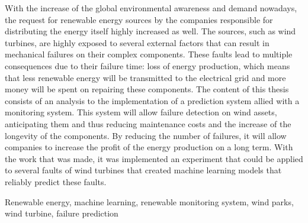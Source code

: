 



With the increase of the global environmental awareness and demand nowadays, the request for renewable energy sources by the companies responsible for distributing the energy itself highly increased as well. The sources, such as wind turbines, are highly exposed to several external factors that can result in mechanical failures on their complex components. These faults lead to multiple consequences due to their failure time: loss of energy production, which means that less renewable energy will be transmitted to the electrical grid and more money will be spent on repairing these components. The content of this thesis consists of an analysis to the implementation of a prediction system allied with a monitoring system. This system will allow failure detection on wind assets, anticipating them and thus reducing maintenance costs and the increase of the longevity of the components. By reducing the number of failures, it will allow companies to increase the profit of the energy production on a long term.
With the work that was made, it was implemented an experiment that could be applied to several faults of wind turbines that created machine learning models that reliably predict these faults.

\begin{keywords}
Renewable energy, machine learning, renewable monitoring system, wind parks, wind turbine, failure prediction
\end{keywords} 
